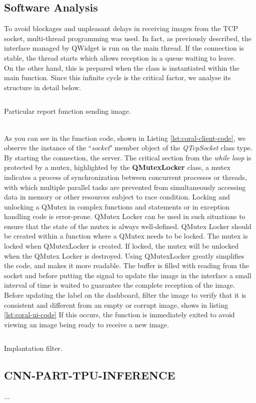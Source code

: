\subsection{Software Analysis}
\label{ssec:software-coral-analysis}
To avoid blockages and unpleasant delays in receiving images from the TCP
socket, multi-thread programming was used. In fact, as previously described, the
interface managed by QWidget is run on the main thread. If the connection is
stable, the thread starts which allows reception in a queue waiting to leave.\\ 
On the other hand, this is prepared when the class is instantiated within the
main function. Since this infinite cycle is the critical factor, we analyse its
structure in detail below.\linebreak
%
\begin{listing}[ht] 
\inputminted[bgcolor=bg,frame=lines,framesep=2mm, linenos=true, autogobble, breaklines=true, fontsize=\scriptsize, firstline=12, lastline=26]{c++}{software/code/streamerthread.cpp} 
\caption{Particular report function sending image.} 
\label{lst:coral-client-code} 
\end{listing}
%
\\As you can see in the function code, shown in Listing
\ref{lst:coral-client-code}, we observe the instance of the ``\emph{socket}"
member object of the \emph{QTcpSocket} class type. By starting the connection,
the server. The critical section from the \emph{while loop} is protected by a
mutex, highlighted by the \textbf{QMutexLocker} class, a mutex indicates a
process of synchronization between concurrent processes or threads, with which
multiple parallel tasks are prevented from simultaneously accessing data in
memory or other resources subject to race condition.\cite{wiki:mutex} 
Locking and unlocking a QMutex in complex functions and statements or in
exception handling code is error-prone. 
QMutex Locker can be used in such situations to ensure that the state of the
mutex is always well-defined. QMutex Locker should be created within a function
where a QMutex needs to be locked. The mutex is locked when QMutexLocker is
created. If locked, the mutex will be unlocked when the QMutex Locker is
destroyed.
Using QMutexLocker greatly simplifies the code, and makes it more
readable.\cite{Qt:QMutexclass}
The buffer is filled with reading from the socket and before putting the signal
to update the image in the interface a small interval of time is waited to
guarantee the complete reception of the image.
Before updating the label on the dashboard, filter the image to verify that it
is consistent and different from an empty or corrupt image, shows in listing
\ref{lst:coral-ui-code} If this occurs, the function is immediately exited to
avoid viewing an image being ready to receive a new image. 
%
\begin{listing}[ht] 
\inputminted[bgcolor=bg,frame=lines,framesep=2mm, linenos=true, autogobble, breaklines=true, fontsize=\scriptsize, firstline=88, lastline=100]{c++}{software/code/tcpclient.cpp} 
\caption{Implantation filter.} 
\label{lst:coral-ui-code} 
\end{listing}
%
\subsection{CNN-PART-TPU-INFERENCE}
...
\newpage
